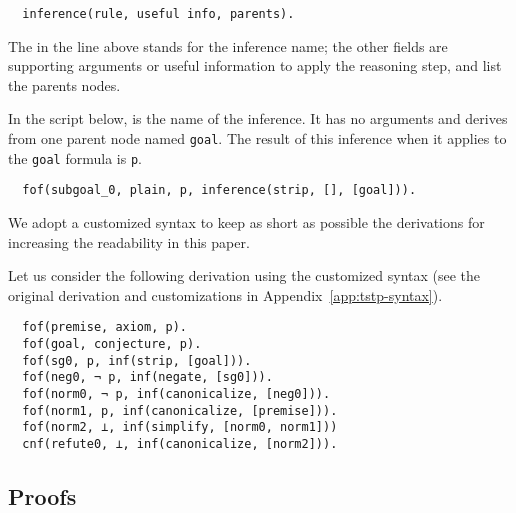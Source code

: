 \documentclass[../main.tex]{subfiles}
\begin{document}
\begin{verbatim}
  inference(rule, useful info, parents).
\end{verbatim}

The  in the line above stands for the inference name;
the other fields are supporting arguments or useful information to
apply the reasoning step, and list the parents nodes.

\begin{myexamplenum}

In the script below, \strip is the name of the inference.
It has no arguments and derives from one parent node named  \verb!goal!. The
result of this inference when it applies to the \verb!goal! formula is
\verb!p!.

\begin{verbatim}
  fof(subgoal_0, plain, p, inference(strip, [], [goal])).
\end{verbatim}
\end{myexamplenum}

\begin{notation}

We adopt a customized \TSTP syntax to keep as short as possible the \Metis
derivations for increasing the readability in this paper.

\begin{myexamplenum}
\label{fig:metis-example-tree}

Let us consider the following \TSTP derivation using
the customized \TSTP syntax (see the original \TSTP derivation and customizations in Appendix~\ref{app:tstp-syntax}).

\begin{verbatim}
  fof(premise, axiom, p).
  fof(goal, conjecture, p).
  fof(sg0, p, inf(strip, [goal])).
  fof(neg0, ¬ p, inf(negate, [sg0])).
  fof(norm0, ¬ p, inf(canonicalize, [neg0])).
  fof(norm1, p, inf(canonicalize, [premise])).
  fof(norm2, ⊥, inf(simplify, [norm0, norm1]))
  cnf(refute0, ⊥, inf(canonicalize, [norm2])).
\end{verbatim}

\end{myexamplenum}
\end{notation}


\subsection{Proofs}
\label{ssec:metis-proofs}
\end{document}
